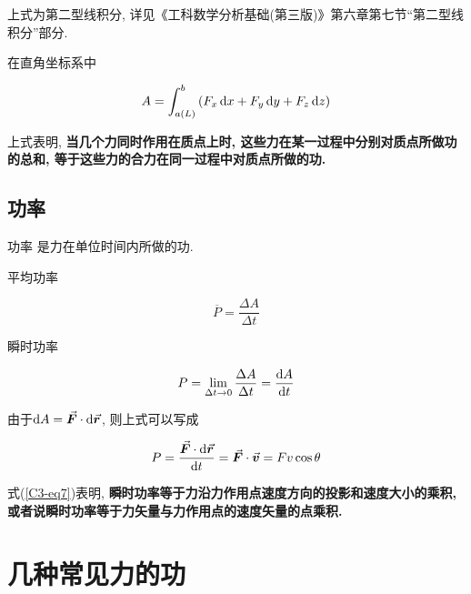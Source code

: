 \begin{note}
	上式为第二型线积分, 详见《工科数学分析基础(第三版)》第六章第七节“第二型线积分”部分. 
\end{note}

在直角坐标系中

\begin{equation}
	A = \int_{a(L)}^{b} \qty(F_x \dd{x} + F_y \dd{y} + F_z \dd{z}) \label{C3-eq4}
\end{equation}

上式表明, \textbf{当几个力同时作用在质点上时, 这些力在某一过程中分别对质点所做功的总和, 等于这些力的合力在同一过程中对质点所做的功. }

\subsection{功率}

\begin{definition}[功率] \label{C3-df1}
	
	{\heiti 功率} 是力在单位时间内所做的功. 
	
	平均功率
	
	\begin{equation}
		\overline{P} = \dfrac{\Delta A}{\Delta t} \label{C3-eq5}
	\end{equation}

    瞬时功率
    
    \begin{equation}
    	P = \lim\limits_{\Delta t \to 0} \dfrac{\Delta A}{\Delta t} = \dv{A}{t} \label{C3-eq6}
    \end{equation}

    由于$\dd{A} = \va*{F} \cdot \dd{\va*{r}}$, 则上式可以写成
    
    \begin{equation}
    	P = \dfrac{\va*{F} \cdot \dd{\va*{r}}}{\dd{t}} = \va*{F} \cdot \va*{v} = F v \cos \theta \label{C3-eq7}
    \end{equation}
    
\end{definition}

式(\ref{C3-eq7})表明, \textbf{瞬时功率等于力沿力作用点速度方向的投影和速度大小的乘积, 或者说瞬时功率等于力矢量与力作用点的速度矢量的点乘积. }

\section{几种常见力的功} \label{3.2}

